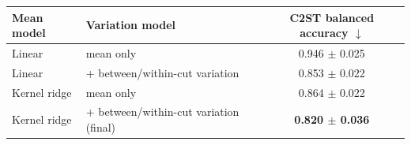 \begin{tabular}{llc}
\toprule
Mean model & Variation model & C2ST balanced accuracy $\downarrow$ \\
\midrule
Linear & mean only & 0.946 $\pm$ 0.025 \\
Linear & + between/within-cut variation & 0.853 $\pm$ 0.022 \\
Kernel ridge & mean only & 0.864 $\pm$ 0.022 \\
Kernel ridge & + between/within-cut variation (final) & \cellcolor{gray!20}\textbf{0.820 $\pm$ 0.036} \\
\bottomrule
\end{tabular}
